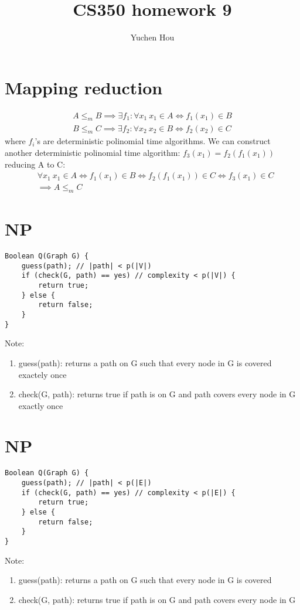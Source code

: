 \documentclass{article}
\begin{document}
\lstset{language=Java, tabsize=4}
\title{CS350 homework 9}
\author{Yuchen Hou}
\maketitle

\section{Mapping reduction}
\begin{align*}
A \leq_m B \implies \exists f_1: \forall x_1 \ x_1 \in A \iff f_1(x_1) \in B\\
B \leq_m C \implies \exists f_2: \forall x_2 \ x_2 \in B \iff f_2(x_2) \in C
\end{align*}
where $f_i$'s are deterministic polinomial time algorithms. We can construct
another deterministic polinomial time algorithm: $f_3(x_1) = f_2(f_1(x_1))$
reducing A to C:
\begin{align*}
&\forall x_1 \ x_1 \in A \iff f_1(x_1) \in B \iff f_2(f_1(x_1)) \in C \iff
f_3(x_1) \in C \\
&\implies A \leq_m C
\end{align*}

\section{NP}
\begin{lstlisting}
Boolean Q(Graph G) {
	guess(path); // |path| < p(|V|)
	if (check(G, path) == yes) // complexity < p(|V|) {
		return true;
	} else {
		return false;
	}
}
\end{lstlisting}
Note:
\begin{enumerate}
  \item guess(path): returns a path on G such that every node in G is covered
  exactely once
  \item check(G, path): returns true if path is on G and path covers every node
  in G exactly once
\end{enumerate}

\section{NP}
\begin{lstlisting}
Boolean Q(Graph G) {
	guess(path); // |path| < p(|E|)
	if (check(G, path) == yes) // complexity < p(|E|) {
		return true;
	} else {
		return false;
	}
}
\end{lstlisting}
Note:
\begin{enumerate}
  \item guess(path): returns a path on G such that every node in G is covered
  \item check(G, path): returns true if path is on G and path covers every node
  in G
\end{enumerate}
\end{document}
